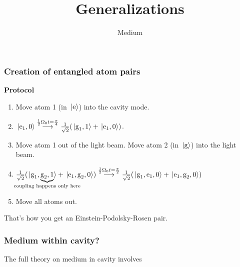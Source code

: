 \documentclass[t]{beamer}
\begin{document}
\begin{frame}
\frametitle{Creation of entangled atom pairs}

\textbf{Protocol}
\begin{enumerate}
    \item Move atom 1 (in $\ket*{\text{e}}$) into the cavity mode. 
    \item $\ket*{\text{e}_1, 0} \stackrel{\frac{1}{2} \Omega_0 t = \frac{\pi}{4}}{\longrightarrow} \frac{1}{\sqrt{2}} (\ket*{\text{g}_1, 1} + \ket*{\text{e}_1, 0})$.
    \item Move atom 1 out of the light beam. Move atom 2 (in $\ket*{\text{g}}$) into the light beam.
    \item $\frac{1}{\sqrt{2}} (\ket*{\text{g}_1, \underbrace{\text{g}_2, 1}_{\mathclap{\text{coupling happens only here}}}} + \ket*{\text{e}_1, \text{g}_2, 0}) 
    \stackrel{\frac{1}{2} \Omega_0 t = \frac{\pi}{2}}{\longrightarrow} 
    \frac{1}{\sqrt{2}} (\ket*{\text{g}_1, \text{e}_1, 0} + \ket*{\text{e}_1, \text{g}_2, 0})$
    \item Move all atoms out. 
\end{enumerate}

That's how you get an Einstein-Podolsky-Rosen pair.

\end{frame}

\title{Generalizations}
\subtitle{Medium}
\author{}
\date{}

\begin{frame}
    \titlepage
\end{frame}

\begin{frame}
\frametitle{Medium within cavity?}

The full theory on medium in cavity involves 

\end{frame}
\end{document}
